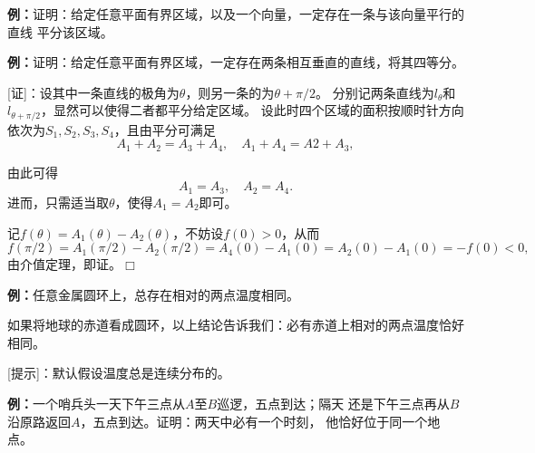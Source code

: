 {\bf 例：}证明：给定任意平面有界区域，以及一个向量，一定存在一条与该向量平行的直线
平分该区域。

{\bf 例：}证明：给定任意平面有界区域，一定存在两条相互垂直的直线，将其四等分。

[证]：设其中一条直线的极角为$\theta$，则另一条的为$\theta+\pi/2$。
分别记两条直线为$l_{\theta}$和$l_{\theta+\pi/2}$，显然可以使得二者都平分给定区域。
设此时四个区域的面积按顺时针方向依次为$S_1,S_2,S_3,S_4$，且由平分可满足
$$A_1+A_2=A_3+A_4,\quad A_1+A_4=A2+A_3,$$

\begin{center}
\end{center}

由此可得
$$A_1=A_3,\quad A_2=A_4.$$
进而，只需适当取$\theta$，使得$A_1=A_2$即可。

记$f(\theta)=A_1(\theta)-A_2(\theta)$，不妨设$f(0)>0$，从而
$$f(\pi/2)=A_1(\pi/2)-A_2(\pi/2)=A_4(0)-A_1(0)=A_2(0)-A_1(0)=-f(0)<0,$$
由介值定理，即证。\hfill$\Box$

{\bf 例：}任意金属圆环上，总存在相对的两点温度相同。

如果将地球的赤道看成圆环，以上结论告诉我们：必有赤道上相对的两点温度恰好相同。

[提示]：默认假设温度总是连续分布的。

{\bf 例：}一个哨兵头一天下午三点从$A$至$B$巡逻，五点到达；隔天
还是下午三点再从$B$沿原路返回$A$，五点到达。证明：两天中必有一个时刻，
他恰好位于同一个地点。


